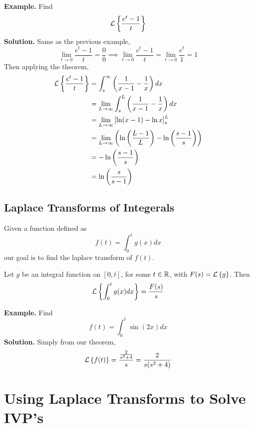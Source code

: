 \documentclass[openany]{report}
\begin{document}
\textbf{Example.} Find 
\[\mathcal{L}\left\{\frac{e^t - 1}{t}\right\}\]
\textbf{Solution.} Same as the previous example, 
\[\lim_{t\rightarrow 0} \frac{e^t - 1}{t} = \frac{0}{0} \implies \lim_{t\rightarrow 0}\frac{e^{t}-1}{t} = \lim_{t\rightarrow 0}\frac{e^t}{1} = 1\]
Then applying the theorem, 
\begin{align*}
    \mathcal{L}\left\{\frac{e^t - 1}{t}\right\} &= \int_s^\infty \left(\frac{1}{x-1} -  \frac{1}{x}\right)dx\\
    &= \lim_{L\rightarrow \infty} \int_s^L \left(\frac{1}{x-1} - \frac{1}{x}\right)dx\\
    &= \lim_{L\rightarrow\infty}\left[\ln(x-1) - \ln x\right]_s^L\\
    &= \lim_{L \rightarrow \infty} \left(\ln\left(\frac{L-1}{L}\right) - \ln\left(\frac{s-1}{s}\right)\right)\\
    &= - \ln\left(\frac{s-1}{s}\right)\\
    &= \ln\left(\frac{s}{s-1}\right)
\end{align*}

\subsection{Laplace Transforms of Integerals}
Given a function defined as 
\[f(t) = \int_0^t g(x)dx\]
our goal is to find the laplace transform of $f(t)$. 

\begin{theorem}
    Let $g$ be an integral function on $[0,t]$, for some $t \in \mathbb{R}$, with $F(s) = \mathcal{L}\left\{g\right\}$. Then 
    \[\mathcal{L}\left\{\int_0^t g(x)dx\right\} = \frac{F(s)}{s} \] 
\end{theorem}

\textbf{Example.} Find 
\[f(t) = \int_0^t \sin(2x)dx\]
\textbf{Solution.} Simply from our theorem, 
\[\mathcal{L}\left\{f(t)\right\} = \frac{\frac{2}{s^2+4}}{s} = \frac{2}{s(s^2+4)}\]

\section{Using Laplace Transforms to Solve IVP's}
\end{document}

